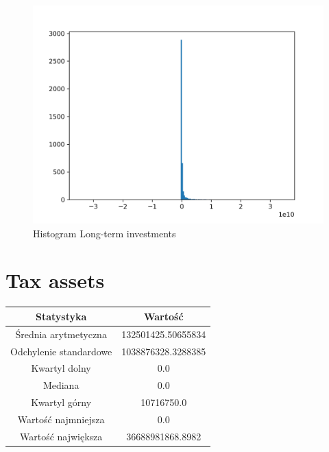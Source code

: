\documentclass{article}
\begin{document}
\begin{figure}[h!]
    \includegraphics[width=\linewidth]{variables/Long-term investments.png}
    \caption{Histogram Long-term investments }
\end{figure}\section{ Tax assets }

\begin{center}
    \begin{tabular}{|c | c|} 
    \hline
    Statystyka & Wartość \\
    \hline\hline
    Średnia arytmetyczna & 132501425.50655834 \\ 
    \hline
    Odchylenie standardowe & 1038876328.3288385 \\
    \hline
    Kwartyl dolny & 0.0 \\
    \hline
    Mediana & 0.0 \\
    \hline
    Kwartyl górny & 10716750.0 \\
    \hline
    Wartość najmniejsza & 0.0 \\
    \hline
    Wartość największa & 36688981868.8982 \\
    \hline
   \end{tabular}
\end{center}
\end{document}
